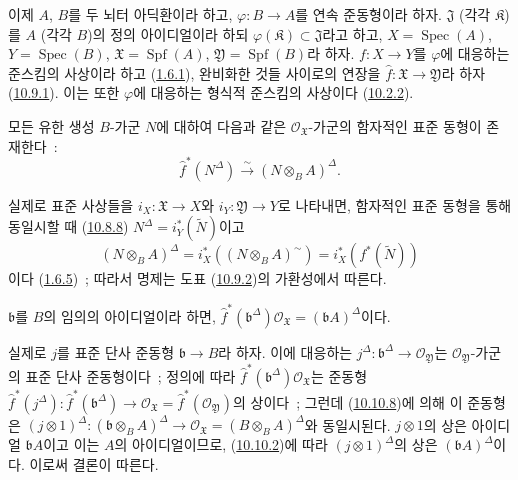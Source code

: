 \begin{env}[10.10.7]
\label{I.10.10.7-ko}
이제 $A$, $B$를 두 뇌터 아딕환이라 하고,
$\varphi:B\to A$를 연속 준동형이라 하자. $\mathfrak{J}$ (각각
$\mathfrak{K}$)를 $A$ (각각 $B$)의 정의 아이디얼이라 하되
$\varphi(\mathfrak{K})\subset\mathfrak{J}$라고 하고,
$X=\operatorname{Spec}(A)$, $Y=\operatorname{Spec}(B)$,
$\mathfrak{X}=\operatorname{Spf}(A)$,
$\mathfrak{Y}=\operatorname{Spf}(B)$라 하자. $f:X\to Y$를
$\varphi$에 대응하는 준스킴의 사상이라 하고
(\hyperref[I.1.6.1-ko]{1.6.1}), 완비화한 것들 사이로의 연장을
$\widehat f:\mathfrak{X}\to\mathfrak{Y}$라 하자
(\hyperref[I.10.9.1-ko]{10.9.1}). 이는 또한 $\varphi$에 대응하는
형식적 준스킴의 사상이다 (\hyperref[I.10.2.2-ko]{10.2.2}).
\end{env}

\begin{proposition}[10.10.8]
\label{I.10.10.8-ko}
모든 유한 생성 $B$-가군 $N$에 대하여 다음과 같은
$\mathscr{O}_{\mathfrak{X}}$-가군의 함자적인 표준 동형이 존재한다~:
\[
  \widehat f^*(N^\Delta)
  \xrightarrow{\sim}
  (N\otimes_B A)^\Delta.
\]
\end{proposition}

실제로 표준 사상들을 $i_X:\mathfrak{X}\to X$와
$i_Y:\mathfrak{Y}\to Y$로 나타내면, 함자적인 표준 동형을 통해
동일시할 때 (\hyperref[I.10.8.8-ko]{10.8.8})
$N^\Delta=i_Y^*(\widetilde N)$이고
\[
  (N\otimes_B A)^\Delta
  =i_X^*((N\otimes_B A)^{\sim})
  =i_X^*(f^*(\widetilde N))
\]
이다 (\hyperref[I.1.6.5-ko]{1.6.5})~; 따라서 명제는 도표
(\hyperref[I.10.9.2-ko]{10.9.2})의 가환성에서 따른다.

\begin{corollary}[10.10.9]
\label{I.10.10.9-ko}
$\mathfrak b$를 $B$의 임의의 아이디얼이라 하면,
$\widehat f^*(\mathfrak b^\Delta)\mathscr{O}_{\mathfrak{X}}
=(\mathfrak bA)^\Delta$이다.
\end{corollary}

실제로 $j$를 표준 단사 준동형 $\mathfrak b\to B$라 하자. 이에 대응하는
$j^\Delta:\mathfrak b^\Delta\to\mathscr{O}_{\mathfrak{Y}}$는
$\mathscr{O}_{\mathfrak{Y}}$-가군의 표준 단사 준동형이다~;
정의에 따라
$\widehat f^*(\mathfrak b^\Delta)\mathscr{O}_{\mathfrak{X}}$는 준동형
$\widehat f^*(j^\Delta):\widehat f^*(\mathfrak b^\Delta)\to
\mathscr{O}_{\mathfrak{X}}=\widehat f^*(\mathscr{O}_{\mathfrak{Y}})$의
상이다~; 그런데 (\hyperref[I.10.10.8-ko]{10.10.8})에 의해 이 준동형은
$(j\otimes1)^\Delta:(\mathfrak b\otimes_B A)^\Delta\to
\mathscr{O}_{\mathfrak{X}}=(B\otimes_B A)^\Delta$와 동일시된다.
$j\otimes1$의 상은 아이디얼 $\mathfrak bA$이고 이는 $A$의 아이디얼이므로,
(\hyperref[I.10.10.2-ko]{10.10.2})에 따라 $(j\otimes1)^\Delta$의 상은
$(\mathfrak bA)^\Delta$이다. 이로써 결론이 따른다.

